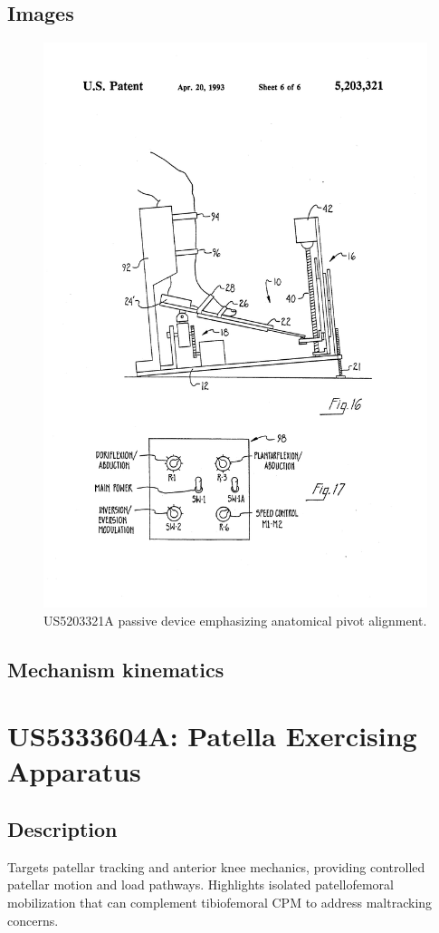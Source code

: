 \documentclass[11pt]{article}
\begin{document}
\subsection{Images}
\begin{figure}[H]
  \centering
  \includegraphics[width=0.54\linewidth]{US5203321_1.png}
  \caption{US5203321A passive device emphasizing anatomical pivot alignment.}
  \label{fig:US5203321A}
\end{figure}

\subsection{Mechanism kinematics}

\section{US5333604A: Patella Exercising Apparatus}
\subsection{Description}
Targets patellar tracking and anterior knee mechanics, providing controlled patellar motion and load pathways. Highlights isolated patellofemoral mobilization that can complement tibiofemoral CPM to address maltracking concerns.
\end{document}
